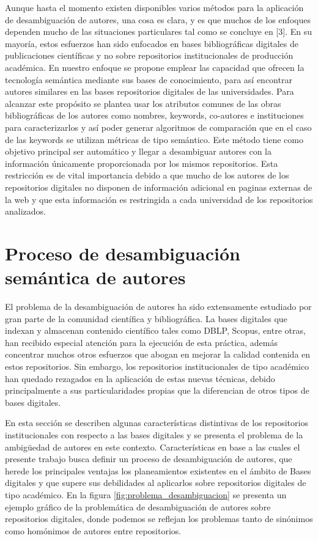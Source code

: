\documentclass[conference]{IEEEtran}
\begin{document}
Aunque  hasta el momento existen disponibles varios métodos para la aplicación de desambiguación de autores, una cosa es clara, y es que muchos de los enfoques dependen mucho de las situaciones particulares tal como se concluye en [3]. En su mayoría, estos esfuerzos han sido enfocados en bases bibliográficas digitales de publicaciones científicas  y no sobre repositorios institucionales de producción académica.  En nuestro enfoque se propone emplear las capacidad que ofrecen la tecnología semántica mediante sus bases de conocimiento, para así encontrar autores similares en las bases repositorios digitales de las universidades. Para alcanzar  este propósito se plantea usar los atributos comunes de las obras bibliográficas de los autores como nombres, keywords, co-autores e instituciones para caracterizarlos   y así poder generar algoritmos de comparación que en el caso de las keywords se utilizan métricas de tipo semántico.  Este método tiene como objetivo principal ser automático y llegar a desambiguar autores con la información únicamente proporcionada por  los mismos repositorios. Esta restricción es de vital importancia debido a que mucho de los autores de los repositorios digitales no disponen de información adicional en paginas externas de la web y que esta información es restringida a cada universidad de los repositorios analizados.


\section{Proceso de desambiguación semántica de autores}
El problema de la desambiguación de autores ha sido extensamente estudiado por gran parte de la comunidad científica y bibliográfica. La bases digitales que indexan y almacenan contenido científico tales como DBLP, Scopus, entre otras, han recibido especial atención para la ejecución de esta práctica, además concentrar muchos otros esfuerzos que abogan en mejorar la calidad contenida en estos repositorios. Sin embargo, los repositorios institucionales de tipo académico  han quedado rezagados en la aplicación de estas nuevas técnicas, debido principalmente  a sus particularidades propias que la diferencian de otros tipos de bases digitales. 

En esta sección se describen algunas características distintivas de los repositorios institucionales con respecto a las bases digitales y se presenta el problema de la ambigüedad de autores en este contexto. Características en base a las cuales el presente trabajo busca definir un proceso de desambiguación de autores, que herede los principales ventajas los planeamientos existentes en el ámbito de Bases digitales y que supere sus debilidades al aplicarlos sobre repositorios digitales de  tipo académico. En la figura \ref{fig:problema_desambiguacion} se presenta un ejemplo gráfico de la problemática de desambiguación de autores sobre repositorios digitales, donde podemos se reflejan los problemas tanto de sinónimos como homónimos de autores  entre repositorios.
\end{document}
